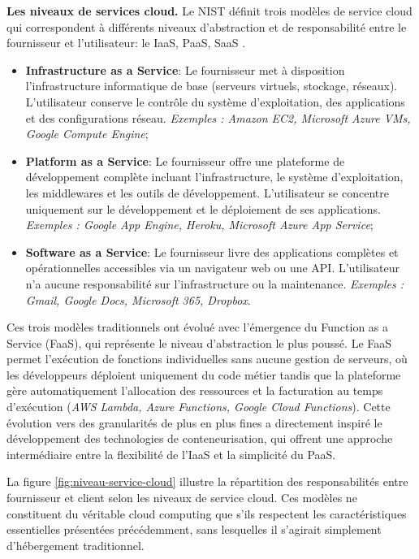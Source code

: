 \textbf{Les niveaux de services cloud.}
Le NIST définit trois modèles de service cloud qui correspondent à différents niveaux d'abstraction et de responsabilité entre le fournisseur et l'utilisateur: le IaaS, PaaS, SaaS \cite{mell2011nist, jonas2019cloud, rashid2019cloud}.
\begin{itemize}
    \item \textbf{Infrastructure as a Service}: Le fournisseur met à disposition l'infrastructure informatique de base (serveurs virtuels, stockage, réseaux). L'utilisateur conserve le contrôle du système d'exploitation, des applications et des configurations réseau. \textit{Exemples : Amazon EC2, Microsoft Azure VMs, Google Compute Engine};
    \item \textbf{Platform as a Service}: Le fournisseur offre une plateforme de développement complète incluant l'infrastructure, le système d'exploitation, les middlewares et les outils de développement. L'utilisateur se concentre uniquement sur le développement et le déploiement de ses applications. \textit{Exemples : Google App Engine, Heroku, Microsoft Azure App Service};
    \item \textbf{Software as a Service}: Le fournisseur livre des applications complètes et opérationnelles accessibles via un navigateur web ou une API. L'utilisateur n'a aucune responsabilité sur l'infrastructure ou la maintenance. \textit{Exemples : Gmail, Google Docs, Microsoft 365, Dropbox}.
\end{itemize}
Ces trois modèles traditionnels ont évolué avec l'émergence du Function as a Service (FaaS), qui représente le niveau d'abstraction le plus poussé. Le FaaS permet l'exécution de fonctions individuelles sans aucune gestion de serveurs, où les développeurs déploient uniquement du code métier tandis que la plateforme gère automatiquement l'allocation des ressources et la facturation au temps d'exécution (\textit{AWS Lambda, Azure Functions, Google Cloud Functions}). Cette évolution vers des granularités de plus en plus fines a directement inspiré le développement des technologies de conteneurisation, qui offrent une approche intermédiaire entre la flexibilité de l'IaaS et la simplicité du PaaS.

La figure \ref{fig:niveau-service-cloud} illustre la répartition des responsabilités entre fournisseur et client selon les niveaux de service cloud. Ces modèles ne constituent du véritable cloud computing que s'ils respectent les caractéristiques essentielles présentées précédemment, sans lesquelles il s'agirait simplement d'hébergement traditionnel.

